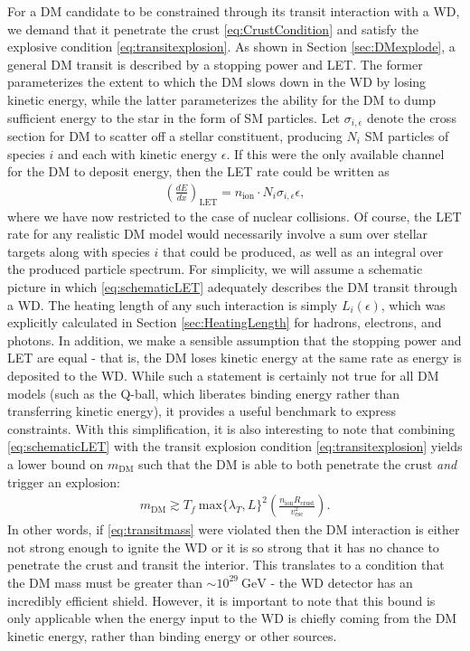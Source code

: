 \documentclass[twocolumn,showpacs,preprintnumbers,amsmath,amssymb,prd]{revtex4}
\newcommand{\GeV}{\text{GeV}}
\def\r{\right)}
\def\l{\left(}
\begin{document}
For a DM candidate to be constrained through its transit interaction with a WD, we demand that it penetrate the crust \eqref{eq:CrustCondition} and satisfy the explosive condition \eqref{eq:transitexplosion}.
As shown in Section \ref{sec:DMexplode}, a general DM transit is described by a stopping power and LET.
The former parameterizes the extent to which the DM slows down in the WD by losing kinetic energy, while the latter parameterizes the ability for the DM to dump sufficient energy to the star in the form of SM particles.
Let $\sigma_{i,\epsilon}$ denote the cross section for DM to scatter off a stellar constituent, producing $N_i$ SM particles of species $i$ and each with kinetic energy $\epsilon$.
If this were the only available channel for the DM to deposit energy, then the LET rate could be written as
\begin{align}
\label{eq:schematicLET}
  \left( \frac{d E}{d x} \right)_\text{LET} = n_\text{ion} \cdot N_i \sigma_{i,\epsilon} \epsilon,
\end{align}
where we have now restricted to the case of nuclear collisions.
Of course, the LET rate for any realistic DM model would necessarily involve a sum over stellar targets along with species $i$ that could be produced, as well as an integral over the produced particle spectrum.
For simplicity, we will assume a schematic picture in which \eqref{eq:schematicLET} adequately describes the DM transit through a WD.
The heating length of any such interaction is simply $L_i(\epsilon)$, which was explicitly calculated in Section \ref{sec:HeatingLength} for hadrons, electrons, and photons.
In addition, we make a sensible assumption that the stopping power and LET are equal - that is, the DM loses kinetic energy at the same rate as energy is deposited to the WD.
While such a statement is certainly not true for all DM models (such as the Q-ball, which liberates binding energy rather than transferring kinetic energy), it provides a useful benchmark to express constraints.
With this simplification, it is also interesting to note that combining \eqref{eq:schematicLET} with the transit explosion condition \eqref{eq:transitexplosion} yields a lower bound on $m_{\text{DM}}$ such that the DM is able to both penetrate the crust \emph{and} trigger an explosion:
\begin{align}
\label{eq:transitmass}
m_{\text{DM}} \gtrsim  T_f ~\text{max}\{\lambda_T, L\}^2 \l \frac{n_{\text{ion}} R_{\text{crust}}}{v_{\text{esc}}^2} \r.
\end{align}
In other words, if \eqref{eq:transitmass} were violated then the DM interaction is either not strong enough to ignite the WD or it is so strong that it has no chance to penetrate the crust and transit the interior.
This translates to a condition that the DM mass must be greater than $\sim 10^{29} ~\GeV$ - the WD detector has an incredibly efficient shield.
However, it is important to note that this bound is only applicable when the energy input to the WD is chiefly coming from the DM kinetic energy, rather than binding energy or other sources.
\end{document}
